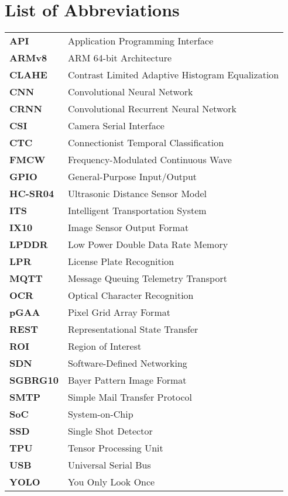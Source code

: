 \cleardoublepage
\section*{List of Abbreviations}
\begin{center}
\begin{tabular}{@{}p{2cm}p{\dimexpr\textwidth-4cm}@{}}
  \textbf{API} & Application Programming Interface \\
  \textbf{ARMv8} & ARM 64-bit Architecture \\
  \textbf{CLAHE} & Contrast Limited Adaptive Histogram Equalization \\
  \textbf{CNN} & Convolutional Neural Network \\
  \textbf{CRNN} & Convolutional Recurrent Neural Network \\
  \textbf{CSI} & Camera Serial Interface \\
  \textbf{CTC} & Connectionist Temporal Classification \\
  \textbf{FMCW} & Frequency-Modulated Continuous Wave \\
  \textbf{GPIO} & General-Purpose Input/Output \\
  \textbf{HC-SR04} & Ultrasonic Distance Sensor Model \\
  \textbf{ITS} & Intelligent Transportation System \\
  \textbf{IX10} & Image Sensor Output Format \\
  \textbf{LPDDR} & Low Power Double Data Rate Memory \\
  \textbf{LPR} & License Plate Recognition \\
  \textbf{MQTT} & Message Queuing Telemetry Transport \\
  \textbf{OCR} & Optical Character Recognition \\
  \textbf{pGAA} & Pixel Grid Array Format \\
  \textbf{REST} & Representational State Transfer \\
  \textbf{ROI} & Region of Interest \\
  \textbf{SDN} & Software-Defined Networking \\
  \textbf{SGBRG10} & Bayer Pattern Image Format \\
  \textbf{SMTP} & Simple Mail Transfer Protocol \\
  \textbf{SoC} & System-on-Chip \\
  \textbf{SSD} & Single Shot Detector \\
  \textbf{TPU} & Tensor Processing Unit \\
  \textbf{USB} & Universal Serial Bus \\
  \textbf{YOLO} & You Only Look Once \\
\end{tabular}
\end{center}

